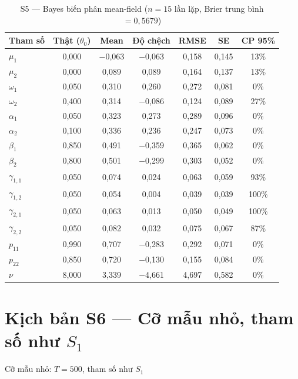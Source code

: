 \documentclass[11pt,a4paper]{article}
\begin{document}
\begin{table}[H]\centering\scriptsize
\caption{S5 --- Bayes biến phân mean-field ($n=15$ lần lặp, Brier trung bình $=0{,}5679$)}
\begin{tabularx}{\textwidth}{l C C C C C C}
\toprule
\textbf{Tham số} & \textbf{Thật ($\theta_0$)} & \textbf{Mean} & \textbf{Độ chệch} & \textbf{RMSE} & \textbf{SE} & \textbf{CP 95\%} \\
\midrule
$\mu_1$ & 0{,}000 & $-$0{,}063 & $-$0{,}063 & 0{,}158 & 0{,}145 & 13\% \\
$\mu_2$ & 0{,}000 & 0{,}089 & 0{,}089 & 0{,}164 & 0{,}137 & 13\% \\
$\omega_1$ & 0{,}050 & 0{,}310 & 0{,}260 & 0{,}272 & 0{,}081 & 0\% \\
$\omega_2$ & 0{,}400 & 0{,}314 & $-$0{,}086 & 0{,}124 & 0{,}089 & 27\% \\
$\alpha_1$ & 0{,}050 & 0{,}323 & 0{,}273 & 0{,}289 & 0{,}096 & 0\% \\
$\alpha_2$ & 0{,}100 & 0{,}336 & 0{,}236 & 0{,}247 & 0{,}073 & 0\% \\
$\beta_1$ & 0{,}850 & 0{,}491 & $-$0{,}359 & 0{,}365 & 0{,}062 & 0\% \\
$\beta_2$ & 0{,}800 & 0{,}501 & $-$0{,}299 & 0{,}303 & 0{,}052 & 0\% \\
$\gamma_{1,1}$ & 0{,}050 & 0{,}074 & 0{,}024 & 0{,}063 & 0{,}059 & 93\% \\
$\gamma_{1,2}$ & 0{,}050 & 0{,}054 & 0{,}004 & 0{,}039 & 0{,}039 & 100\% \\
$\gamma_{2,1}$ & 0{,}050 & 0{,}063 & 0{,}013 & 0{,}050 & 0{,}049 & 100\% \\
$\gamma_{2,2}$ & 0{,}050 & 0{,}082 & 0{,}032 & 0{,}075 & 0{,}067 & 87\% \\
$p_{11}$ & 0{,}990 & 0{,}707 & $-$0{,}283 & 0{,}292 & 0{,}071 & 0\% \\
$p_{22}$ & 0{,}850 & 0{,}720 & $-$0{,}130 & 0{,}155 & 0{,}084 & 0\% \\
$\nu$ & 8{,}000 & 3{,}339 & $-$4{,}661 & 4{,}697 & 0{,}582 & 0\% \\
\bottomrule
\end{tabularx}
\end{table}

\bigskip
\section*{Kịch bản S6 --- Cỡ mẫu nhỏ, tham số như $S_1$}
Cỡ mẫu nhỏ: $T=500$, tham số như $S_1$
\end{document}
